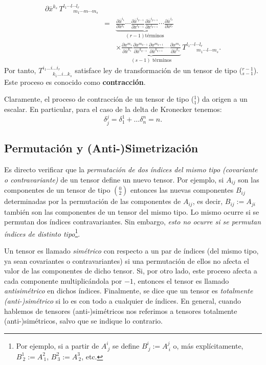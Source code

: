 \begin{eqnarray}
{\partial\bar{x}^{k_{s}}}\,T_{\ \ \ \ \ \ \ \ \ m_1\cdots m\cdots
m_{s}}^{l_1\cdots l\cdots l_{r}}\\
&=&\underbrace{\frac{\partial\bar{x}^{i_1}}{\partial x^{l_1}}\cdots
\frac{\partial\bar{x}^{i_{p-1}}}{\partial x^{l_{p-1}}} \frac{\partial\bar{x}^{i_{p+1}}}{\partial x^{l_{p+1}}} \cdots\frac{\partial\bar{x}^{i_{r}}}{\partial x^{l_{r}}}}_{(r-1) \text{
términos}}\nonumber \\
&& \times \underbrace{\frac{\partial
x^{m_1}}{\partial\bar{x}^{k_1}}\frac{\partial
x^{m_{q-1}}}{\partial\bar{x}^{k_{q-1}}} \frac{\partial
x^{m_{q+1}}}{\partial\bar{x}^{k_{q+1}}}\cdots \frac{\partial x^{m_{s}}}
{\partial\bar{x}^{k_{s}}}}_{(s-1) \text{ términos}}\,T_{\ \ \ \ \ \ \ \ \
m_1\cdots l\cdots m_{s}}^{l_1\cdots l\cdots l_{r}}.
\end{eqnarray}
Por tanto, $T_{\ \ \ \ \ \ \ \ \ k_1\dots i\dots k_{s}}^{i_1\dots i\dots
i_{r}} $ satisface ley de transformación de un tensor de tipo ($_{s-1}^{r-1}$).
Este proceso es conocido como \textbf{contracción}.

Claramente, el proceso de contracción de un tensor de tipo ($_1^1$) da
origen a un escalar. En particular, para el caso de la delta de Kronecker
tenemos:
\begin{equation}
\delta_j^j =\delta_1^1+\dots \delta_n^n=n. \label{con2}
\end{equation}


\subsection{Permutación y (Anti-)Simetrización}

Es directo verificar que la \textit{permutación de dos índices del mismo tipo (covariante o contravariante)} de un tensor define un nuevo tensor. Por ejemplo, si $A_{ij}$ son las componentes de un tensor de tipo $(^0_2)$ entonces las nuevas componentes $B_{ij}$ determinadas por la permutación de las componentes de $A_{ij}$, es decir, $B_{ij}:=A_{ji}$ también son las componentes de un tensor del mismo tipo. Lo mismo ocurre si se permutan dos índices contravariantes. Sin embargo, \textit{esto no ocurre si se permutan índices de distinto tipo}\footnote{Por ejemplo, si a partir de $A^i_{\ j}$ se define $B^i_{\ j}:=A^j_{\ i}$ o, más explícitamente, $B^1_{\ 2}:=A^2_{\ 1}$, $B^2_{\ 3}:=A^3_{\ 2}$, etc.}.

 Un tensor es llamado \textit{simétrico} con respecto a un par de índices (del mismo tipo, ya sean covariantes o contravariantes) si una permutación de ellos no afecta el valor de las componentes de dicho tensor. Si, por otro lado, este proceso afecta a cada
componente multiplicándola por $-1$, entonces el tensor es llamado
\textit{antisimétrico} en dichos índices. Finalmente, se dice que un tensor es
\textit{totalmente (anti-)simétrico} si lo es con todo a cualquier de índices. En general, cuando hablemos de tensores (anti-)simétricos nos referimos a tensores totalmente (anti-)simétricos, salvo que se indique lo contrario.

